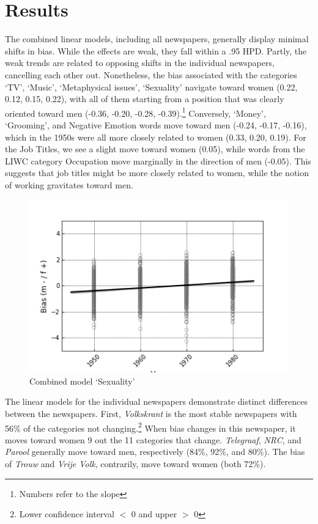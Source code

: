 \documentclass[11pt,a4paper]{article}
\begin{document}
\section{Results}
The combined linear models, including all newspapers, generally display minimal shifts in bias. While the effects are weak, they fall within a .95 HPD. Partly, the weak trends are related to opposing shifts in the individual newspapers, cancelling each other out. Nonetheless, the bias associated with the categories `TV', `Music', `Metaphysical issues', `Sexuality' navigate toward women (0.22, 0.12, 0.15, 0.22), with all of them starting from a position that was clearly oriented toward men (-0.36, -0.20, -0.28, -0.39).\footnote{Numbers refer to the slope} 
Conversely, `Money', `Grooming', and Negative Emotion words move toward men (-0.24, -0.17, -0.16), which in the 1950s were all more closely related to women (0.33, 0.20, 0.19). For the Job Titles, we see a slight move toward women (0.05), while words from the LIWC category Occupation move marginally in the direction of men (-0.05). This suggests that job titles might be more closely related to women, while the notion of working gravitates toward men. 
\begin{figure}
  \includegraphics[width=\linewidth]{figures/combined_Sexual}
  \caption{Combined model `Sexuality'}
  \label{fig:overall_sexuality}
\end{figure}

The linear models for the individual newspapers demonstrate distinct differences between the newspapers. First, \textit{Volkskrant} is the most stable newspapers with 56\% of the categories not changing.\footnote{Lower confidence interval $<$ 0 and upper $>$ 0} When bias changes in this newspaper, it moves toward women 9 out the 11 categories that change. \textit{Telegraaf}, \textit{NRC}, and \textit{Parool} generally move toward men, respectively (84\%, 92\%, and 80\%). The bias of \textit{Trouw} and \textit{Vrije Volk}, contrarily, move toward women (both 72\%). 
\end{document}
